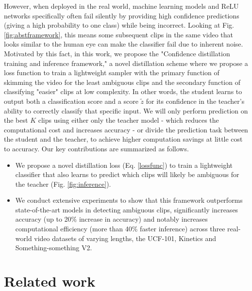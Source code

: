 \documentclass[a4paper,conference]{IEEEtran}
\begin{document}
However, when deployed in the real world, machine learning models \cite{goodfellow2014explaining, amodei2016concrete} and ReLU networks specifically \cite{hein2019relu} often fail silently by providing high confidence predictions (giving a high probability to one class) while being incorrect. Looking at Fig. \ref{fig:abstframework}, this means some subsequent clips in the same video that looks similar to the human eye can make the classifier fail due to inherent noise. Motivated by this fact, in this work, we propose the "Confidence distillation training and inference framework," a novel distillation scheme where we propose a loss function to train a lightweight sampler with the primary function of skimming the video for the least ambiguous clips and the secondary function of classifying "easier" clips at low complexity. In other words, the student learns to output both a classification score and a score $\tilde{z}$ for its confidence in the teacher's ability to correctly classify that specific input. We will only perform prediction on the best $K$ clips using either only the teacher model - which reduces the computational cost and increases accuracy - or divide the prediction task between the student and the teacher, to achieve higher computation savings at little cost to accuracy. Our key contributions are summarized as follows.

\begin{itemize}
    \item We propose a novel distillation loss (Eq. \eqref{lossfunc}) to train a lightweight classifier that also learns to predict which clips will likely be ambiguous for the teacher (Fig. \ref{fig:inference}). 
    \item We conduct extensive experiments to show that this framework outperforms state-of-the-art models in detecting ambiguous clips, significantly increases accuracy (up to 20\% increase in accuracy) and notably increases computational efficiency (more than 40\% faster inference) across three real-world video datasets of varying lengths, the UCF-101, Kinetics and Something-something V2.
\end{itemize}

\section{Related work}
\end{document}
